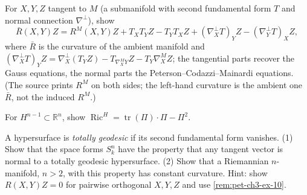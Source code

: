 \begin{remark}[Exercise 3.4.11]
  \label{rem:pet-ch3-ex-11}
  \leanok
  For $X,Y,Z$ tangent to $M$ (a submanifold with second fundamental form $T$ and
  normal connection $\nabla^\perp$), show
  \[
    \bar R(X,Y)Z=R^M(X,Y)Z+T_XT_YZ-T_YT_XZ+(\nabla^\perp_XT)_YZ-(\nabla^\perp_YT)_XZ,
  \]
  where $\bar R$ is the curvature of the ambient manifold and
  $(\nabla^\perp_XT)_YZ=\nabla^\perp_X(T_YZ)-T_{\nabla^M_XY}Z-T_Y\nabla^M_XZ$;
  the tangential parts recover the Gauss equations, the normal parts the
  Peterson--Codazzi--Mainardi equations. (The source prints $R^M$ on both sides;
  the left-hand curvature is the ambient one $\bar R$, not the induced $R^M$.)
\end{remark}

\begin{remark}[Exercise 3.4.12]
  \label{rem:pet-ch3-ex-12}
  \leanok
  For $H^{n-1}\subset\mathbb R^n$, show
  $\operatorname{Ric}^H=\operatorname{tr}(\Pi)\cdot\Pi-\Pi^2$.
\end{remark}

\begin{remark}[Exercise 3.4.13]
  \label{rem:pet-ch3-ex-13}
  \leanok
  A hypersurface is \emph{totally geodesic} if its second fundamental form
  vanishes. (1) Show that the space forms $S^n_k$ have the property that any
  tangent vector is normal to a totally geodesic hypersurface. (2) Show that a
  Riemannian $n$-manifold, $n>2$, with this property has constant curvature.
  Hint: show $R(X,Y)Z=0$ for pairwise orthogonal $X,Y,Z$ and use
  \cref{rem:pet-ch3-ex-10}.
\end{remark}

